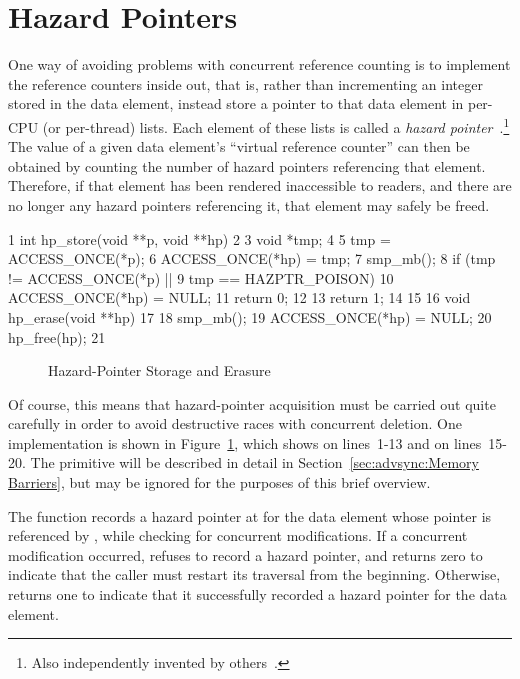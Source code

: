 
\section{Hazard Pointers}
\label{sec:defer:Hazard Pointers}

One way of avoiding problems with concurrent reference counting
is to implement the reference counters
inside out, that is, rather than incrementing an integer stored in the
data element, instead store a pointer to that data element in
per-CPU (or per-thread) lists.
Each element of these lists is called a
\emph{hazard pointer}~\cite{MagedMichael04a}.\footnote{
	Also independently invented by others~\cite{HerlihyLM02}.}
The value of a given data element's ``virtual reference counter'' can
then be obtained by counting the number of hazard pointers referencing
that element.
Therefore, if that element has been rendered inaccessible to readers,
and there are no longer any hazard pointers referencing it, that element
may safely be freed.

{ \scriptsize
\begin{verbbox}
 1 int hp_store(void **p, void **hp)
 2 {
 3   void *tmp;
 4 
 5   tmp = ACCESS_ONCE(*p);
 6   ACCESS_ONCE(*hp) = tmp;
 7   smp_mb();
 8   if (tmp != ACCESS_ONCE(*p) ||
 9       tmp == HAZPTR_POISON) {
10     ACCESS_ONCE(*hp) = NULL;
11     return 0;
12   }
13   return 1;
14 }
15 
16 void hp_erase(void **hp)
17 {
18   smp_mb();
19   ACCESS_ONCE(*hp) = NULL;
20   hp_free(hp);
21 }
\end{verbbox}
}
\begin{figure}[btp]
\centering
\theverbbox
\caption{Hazard-Pointer Storage and Erasure}
\label{fig:defer:Hazard-Pointer Storage and Erasure}
\end{figure}

Of course, this means that hazard-pointer acquisition must be carried
out quite carefully in order to avoid destructive races with concurrent
deletion.
One implementation is shown in
Figure~\ref{fig:defer:Hazard-Pointer Storage and Erasure},
which shows  on lines~1-13 and  on
lines~15-20.
The  primitive will be described in detail in
Section~\ref{sec:advsync:Memory Barriers}, but may be ignored for
the purposes of this brief overview.

The  function records a hazard pointer at  for the data
element whose pointer is referenced by , while checking for
concurrent modifications.
If a concurrent modification occurred,  refuses to record
a hazard pointer, and returns zero to indicate that the caller must
restart its traversal from the beginning.
Otherwise,  returns one to indicate that it successfully
recorded a hazard pointer for the data element.

